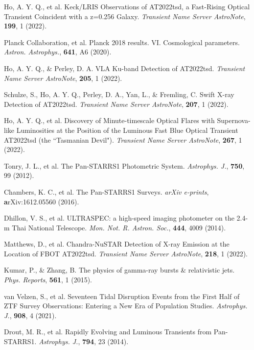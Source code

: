\documentclass{nature_plusfigure}
\newcommand{\mn}{{Mon. Not. R. Astron. Soc.}}
\newcommand{\physrep}{{Phys. Reports}}
\newcommand{\mnras}{\mn}
\newcommand{\apj}{{Astrophys. J.}}
\newcommand{\aap}{{Astron. Astrophys.}}
\begin{document}
\begin{thebibliography}{100}
 Ho, A. Y. Q., et al. Keck/LRIS Observations of AT2022tsd, a Fast-Rising Optical Transient Coincident with a z=0.256 Galaxy. \emph{Transient Name Server AstroNote}, \textbf{199}, 1 (2022). 

 Planck Collaboration, et al. Planck 2018 results. VI. Cosmological parameters. \emph{\aap}, \textbf{641}, A6 (2020). 

 Ho, A. Y. Q., \& Perley, D. A. VLA Ku-band Detection of AT2022tsd. \emph{Transient Name Server AstroNote}, \textbf{205}, 1 (2022). 

 Schulze, S., Ho, A. Y. Q., Perley, D. A., Yan, L., \& Fremling, C. Swift X-ray Detection of AT2022tsd. \emph{Transient Name Server AstroNote}, \textbf{207}, 1 (2022). 

 Ho, A. Y. Q., et al. Discovery of Minute-timescale Optical Flares with Supernova-like Luminosities at the Position of the Luminous Fast Blue Optical Transient AT2022tsd (the ``Tasmanian Devil"). \emph{Transient Name Server AstroNote}, \textbf{267}, 1 (2022). 

 Tonry, J. L., et al. The Pan-STARRS1 Photometric System. \emph{\apj}, \textbf{750}, 99 (2012). 

 Chambers, K. C., et al. The Pan-STARRS1 Surveys. \emph{arXiv e-prints}, \textbf arXiv:1612.05560 (2016). 

 Dhillon, V. S., et al. ULTRASPEC: a high-speed imaging photometer on the 2.4-m Thai National Telescope. \emph{\mnras}, \textbf{444}, 4009 (2014). 

 Matthews, D., et al. Chandra-NuSTAR Detection of X-ray Emission at the Location of FBOT AT2022tsd. \emph{Transient Name Server AstroNote}, \textbf{218}, 1 (2022). 


 Kumar, P., \& Zhang, B. The physics of gamma-ray bursts \& relativistic jets. \emph{\physrep}, \textbf{561}, 1 (2015). 

 van Velzen, S., et al. Seventeen Tidal Disruption Events from the First Half of ZTF Survey Observations: Entering a New Era of Population Studies. \emph{\apj}, \textbf{908}, 4 (2021). 


 Drout, M. R., et al. Rapidly Evolving and Luminous Transients from Pan-STARRS1. \emph{\apj}, \textbf{794}, 23 (2014). 


\end{thebibliography}
\end{document}

